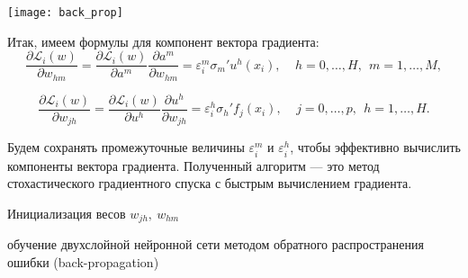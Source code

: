\documentclass{article}
\begin{document}
	\begin{center}
		\begin{minipage}{0.51\linewidth}
			\centering
			\texttt{[image: back\_prop]}
		\end{minipage}
	\end{center}
	
	Итак, имеем формулы для компонент вектора градиента:
	\begin{equation*}
		\frac{\partial \mathcal{L}_i(w)}{\partial w_{hm}} = \frac{\partial \mathcal{L}_i(w)}{\partial a^m} \frac{\partial a^m}{\partial w_{hm}} =   \varepsilon^m_i \sigma_m' u^h(x_i), ~~~~~ h=0,\ldots,H, ~~ m=1,\ldots,M,
	\end{equation*}
	
	\begin{equation*}
		\frac{\partial \mathcal{L}_i(w)}{\partial w_{jh}} = \frac{\partial \mathcal{L}_i(w)}{\partial u^h} \frac{\partial u^h}{\partial w_{jh}} =   \varepsilon^h_i \sigma_h' f_j(x_i), ~~~~~ j=0,\ldots,p, ~~ h=1,\ldots,H.
	\end{equation*}
	
	Будем сохранять промежуточные величины $\varepsilon_i^m$ и $\varepsilon_i^h$, чтобы эффективно вычислить компоненты вектора градиента. Полученный алгоритм --- это метод стохастического градиентного спуска с быстрым вычислением градиента. \\
	
	\begin{algorithm}[H]
		\SetAlgoLined
		
		Инициализация весов $w_{jh},~ w_{hm}$\;
		\caption{обучение двухслойной нейронной сети методом обратного распространения ошибки (back-propagation)}
	\end{algorithm}
	~~~\\
	~~~\\
	~~~ \\
	
\end{document}
